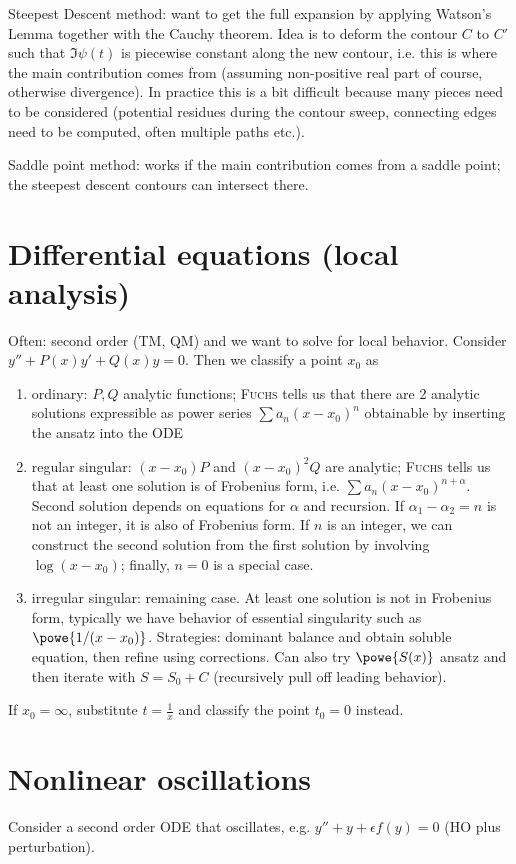 \documentclass[english, parskip=full]{scrbook}
\begin{document}
Steepest Descent method: want to get the full expansion by applying Watson's Lemma together with the Cauchy theorem.
Idea is to deform the contour $C$ to $C'$ such that $\Im \psi(t)$ is piecewise constant along the new contour, i.e. this is where the main contribution comes from (assuming non-positive real part of course, otherwise divergence).
In practice this is a bit difficult because many pieces need to be considered (potential residues during the contour sweep, connecting edges need to be computed, often multiple paths etc.).

Saddle point method: works if the main contribution comes from a saddle point; the steepest descent contours can intersect there.
\section{Differential equations (local analysis)}
Often: second order (TM, QM) and we want to solve for local behavior.
Consider $y''+P(x)y'+Q(x)y=0$.
Then we classify a point $x_0$ as
\begin{enumerate}
\item ordinary: $P,Q$ analytic functions; \textsc{Fuchs} tells us that there are 2 analytic solutions expressible as power series $\sum a_n (x-x_0)^n$ obtainable by inserting the ansatz into the ODE
\item regular singular: $(x-x_0)P$ and $(x-x_0)^2Q$ are analytic; \textsc{Fuchs} tells us that at least one solution is of Frobenius form, i.e. $\sum a_n (x-x_0)^{n+\alpha}$.
Second solution depends on equations for $\alpha$ and recursion.
If $\alpha_1-\alpha_2=n$ is not an integer, it is also of Frobenius form.
If $n$ is an integer, we can construct the second solution from the first solution by involving $\log(x-x_0)$; finally, $n=0$ is a special case.
\item irregular singular: remaining case. At least one solution is not in Frobenius form, typically we have behavior of essential singularity such as $\powe{1/(x-x_0)}$.
Strategies: dominant balance and obtain soluble equation, then refine using corrections.
Can also try $\powe{S(x)}$ ansatz and then iterate with $S=S_0+C$ (recursively pull off leading behavior).
\end{enumerate}
If $x_0=\infty$, substitute $t=\frac{1}{x}$ and classify the point $t_0=0$ instead.
\section{Nonlinear oscillations}
Consider a second order ODE that oscillates, e.g. $y''+y+\epsilon f(y)=0$ (HO plus perturbation).
\end{document}
